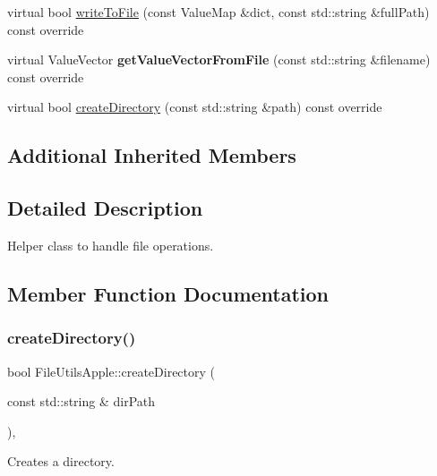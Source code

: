 \begin{DoxyCompactItemize}
\item 
virtual bool \hyperlink{classFileUtilsApple_a2c762108569f84b4db36ae6d6cb3760f}{write\+To\+File} (const Value\+Map \&dict, const std\+::string \&full\+Path) const override
\item 
\mbox{\label{classFileUtilsApple_ad246f5fafe8c6281395997f50a965641}} 
virtual Value\+Vector {\bfseries get\+Value\+Vector\+From\+File} (const std\+::string \&filename) const override
\item 
virtual bool \hyperlink{classFileUtilsApple_a104a38b7f8adf8de79f9ec2fcaa09735}{create\+Directory} (const std\+::string \&path) const override
\end{DoxyCompactItemize}
\subsection*{Additional Inherited Members}


\subsection{Detailed Description}
Helper class to handle file operations. 

\subsection{Member Function Documentation}
\mbox{\label{classFileUtilsApple_a2b55deedf8b0fda7ceec1442f3944b1e}} 
\subsubsection{\texorpdfstring{create\+Directory()}{createDirectory()}\hspace{0.1cm}{\footnotesize\ttfamily [1/2]}}
{\footnotesize\ttfamily bool File\+Utils\+Apple\+::create\+Directory (\begin{DoxyParamCaption}\item[{const std\+::string \&}]{dir\+Path }\end{DoxyParamCaption})\hspace{0.3cm}{\ttfamily [override]}, {\ttfamily [virtual]}}

Creates a directory.


